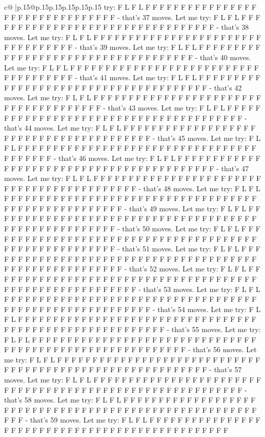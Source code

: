\documentclass{article}
\begin{document}
{\begin{supertabular}{c@{$\;$}|p{.15\linewidth}@{}p{.15\linewidth}p{.15\linewidth}p{.15\linewidth}p{.15\linewidth}p{.15\linewidth}}
{{{try: F L F L F F F F F F F F F F F F F F F F F F F F F F F F F F F F F F F F {-} that's 37 moves. Let me try: F L F L F F F F F F F F F F F F F F F F F F F F F F F F F F F F F F F F F {-} that's 38 moves. Let me try: F L F L F F F F F F F F F F F F F F F F F F F F F F F F F F F F F F F F F F {-} that's 39 moves. Let me try: F L F L F F F F F F F F F F F F F F F F F F F F F F F F F F F F F F F F F F F F {-} that's 40 moves. Let me try: F L F L F F F F F F F F F F F F F F F F F F F F F F F F F F F F F F F F F F F F F {-} that's 41 moves. Let me try: F L F L F F F F F F F F F F F F F F F F F F F F F F F F F F F F F F F F F F F F F F {-} that's 42 moves. Let me try: F L F L F F F F F F F F F F F F F F F F F F F F F F F F F F F F F F F F F F F F F F {-} that's 43 moves. Let me try: F L F L F F F F F F F F F F F F F F F F F F F F F F F F F F F F F F F F F F F F F F F {-} that's 44 moves. Let me try: F L F L F F F F F F F F F F F F F F F F F F F F F F F F F F F F F F F F F F F F F F F F {-} that's 45 moves. Let me try: F L F L F F F F F F F F F F F F F F F F F F F F F F F F F F F F F F F F F F F F F F F F F {-} that's 46 moves. Let me try: F L F L F F F F F F F F F F F F F F F F F F F F F F F F F F F F F F F F F F F F F F F F F F {-} that's 47 moves. Let me try: F L F L F F F F F F F F F F F F F F F F F F F F F F F F F F F F F F F F F F F F F F F F F F F {-} that's 48 moves. Let me try: F L F L F F F F F F F F F F F F F F F F F F F F F F F F F F F F F F F F F F F F F F F F F F F F F F F F F F F F F {-} that's 49 moves. Let me try: F L F L F F F F F F F F F F F F F F F F F F F F F F F F F F F F F F F F F F F F F F F F F F F F F F F F F F F F F F {-} that's 50 moves. Let me try: F L F L F F F F F F F F F F F F F F F F F F F F F F F F F F F F F F F F F F F F F F F F F F F F F F F F F F F F F F F {-} that's 51 moves. Let me try: F L F L F F F F F F F F F F F F F F F F F F F F F F F F F F F F F F F F F F F F F F F F F F F F F F F F F F F F F F F F {-} that's 52 moves. Let me try: F L F L F F F F F F F F F F F F F F F F F F F F F F F F F F F F F F F F F F F F F F F F F F F F F F F F F F F F F F F F F {-} that's 53 moves. Let me try: F L F L F F F F F F F F F F F F F F F F F F F F F F F F F F F F F F F F F F F F F F F F F F F F F F F F F F F F F F F F F {-} that's 54 moves. Let me try: F L F L F F F F F F F F F F F F F F F F F F F F F F F F F F F F F F F F F F F F F F F F F F F F F F F F F F F F F F F F F {-} that's 55 moves. Let me try: F L F L F F F F F F F F F F F F F F F F F F F F F F F F F F F F F F F F F F F F F F F F F F F F F F F F F F F F F F F F F F {-} that's 56 moves. Let me try: F L F L F F F F F F F F F F F F F F F F F F F F F F F F F F F F F F F F F F F F F F F F F F F F F F F F F F F F F F F F F F {-} that's 57 moves. Let me try: F L F L F F F F F F F F F F F F F F F F F F F F F F F F F F F F F F F F F F F F F F F F F F F F F F F F F F F F F F F F F F {-} that's 58 moves. Let me try: F L F L F F F F F F F F F F F F F F F F F F F F F F F F F F F F F F F F F F F F F F F F F F F F F F F F F F F F F F F F F F {-} that's 59 moves. Let me try: F L F L F F F F F F F F F F F F F F F F F F F F F F F F F F F F F F F F F F F F F F F F F F F F F F F F }}}
\end{supertabular}}
\end{document}
